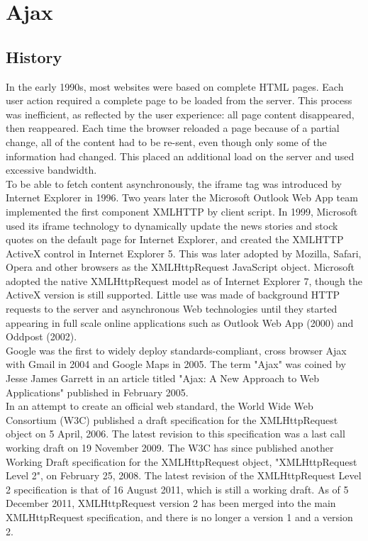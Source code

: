 \section{Ajax}
\label{sec:ajax}
	
\subsection{History}
In the early 1990s, most websites were based on complete HTML pages. Each user action required a complete page to be loaded from the server. This process was inefficient, as reflected by the user experience: all page content disappeared, then reappeared. Each time the browser reloaded a page because of a partial change, all of the content had to be re-sent, even though only some of the information had changed. This placed an additional load on the server and used excessive bandwidth.\\
	
To be able to fetch content asynchronously, the iframe tag was introduced by Internet Explorer in 1996. Two years later the Microsoft Outlook Web App team implemented the first component XMLHTTP by client script.
In 1999, Microsoft used its iframe technology to dynamically update the news stories and stock quotes on the default page for Internet Explorer, and created the XMLHTTP ActiveX control in Internet Explorer 5. This was later adopted by Mozilla, Safari, Opera and other browsers as the XMLHttpRequest JavaScript object. Microsoft adopted the native XMLHttpRequest model as of Internet Explorer 7, though the ActiveX version is still supported. Little use was made of background HTTP requests to the server and asynchronous Web technologies until they started appearing in full scale online applications such as Outlook Web App (2000) and Oddpost (2002).\\
	
Google was the first to widely deploy standards-compliant, cross browser Ajax with Gmail in 2004 and Google Maps in 2005. The term "Ajax" was coined by Jesse James Garrett in an article titled "Ajax: A New Approach to Web Applications" published in February 2005.\\
	
In an attempt to create an official web standard, the World Wide Web Consortium (W3C) published a draft specification for the XMLHttpRequest object on 5 April, 2006. The latest revision to this specification was a last call working draft on 19 November 2009. The W3C has since published another Working Draft specification for the XMLHttpRequest object, "XMLHttpRequest Level 2", on February 25, 2008. The latest revision of the XMLHttpRequest Level 2 specification is that of 16 August 2011, which is still a working draft. As of 5 December 2011, XMLHttpRequest version 2 has been merged into the main XMLHttpRequest specification, and there is no longer a version 1 and a version 2.
		
